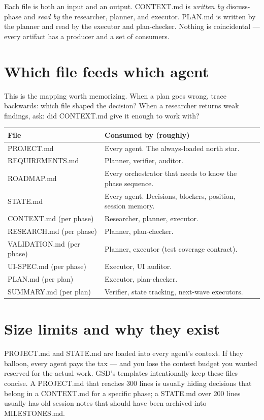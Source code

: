 \documentclass[11pt,letterpaper,openany]{book}
\begin{document}
Each file is both an input and an output. CONTEXT.md is \emph{written by} discuss-phase and \emph{read by} the researcher, planner, and executor. PLAN.md is written by the planner and read by the executor and plan-checker. Nothing is coincidental --- every artifact has a producer and a set of consumers.

\section{Which file feeds which agent}

This is the mapping worth memorizing. When a plan goes wrong, trace backwards: which file shaped the decision? When a researcher returns weak findings, ask: did CONTEXT.md give it enough to work with?

\begin{tabularx}{\textwidth}{l X}
\toprule
\textbf{File} & \textbf{Consumed by (roughly)} \\
\midrule
PROJECT.md & Every agent. The always-loaded north star. \\
REQUIREMENTS.md & Planner, verifier, auditor. \\
ROADMAP.md & Every orchestrator that needs to know the phase sequence. \\
STATE.md & Every agent. Decisions, blockers, position, session memory. \\
CONTEXT.md (per phase) & Researcher, planner, executor. \\
RESEARCH.md (per phase) & Planner, plan-checker. \\
VALIDATION.md (per phase) & Planner, executor (test coverage contract). \\
UI-SPEC.md (per phase) & Executor, UI auditor. \\
PLAN.md (per plan) & Executor, plan-checker. \\
SUMMARY.md (per plan) & Verifier, state tracking, next-wave executors. \\
\bottomrule
\end{tabularx}

\section{Size limits and why they exist}

PROJECT.md and STATE.md are loaded into every agent's context. If they balloon, every agent pays the tax --- and you lose the context budget you wanted reserved for the actual work. GSD's templates intentionally keep these files concise. A PROJECT.md that reaches 300 lines is usually hiding decisions that belong in a CONTEXT.md for a specific phase; a STATE.md over 200 lines usually has old session notes that should have been archived into MILESTONES.md.
\end{document}
